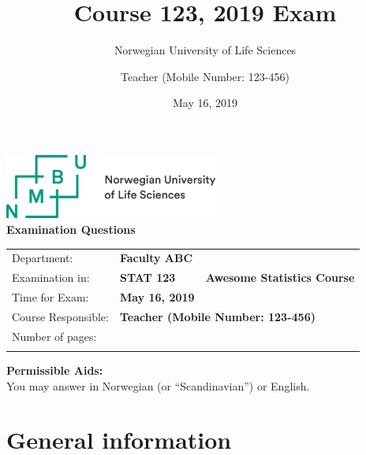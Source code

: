 \documentclass[
11pt,%
a4paper,%
]%
{article}%
\title{Course 123, 2019 Exam}
\subtitle{Norwegian University of Life Sciences}
\author{Teacher (Mobile Number: 123-456)}
\date{May 16, 2019}
\begin{document}
{\centering\includegraphics[width=7cm]{Logo.png}\\\vspace{24pt}}
\doublespacing
\textbf{\Huge Examination Questions}
\vspace{10pt}\\
\begin{tabularx}{\textwidth}{llX}
\toprule
Department: & 
  \multicolumn{2}{l}{\textbf{Faculty ABC}} \\
\cmidrule(r){2-3}
Examination in: & 
  \textbf{STAT 123}& 
  \textbf{Awesome Statistics Course}\\
\cmidrule(r){2-3}
Time for Exam: & 
  \textbf{May 16, 2019} & 
  \\
\cmidrule(r){2-3}
Course Responsible: & \multicolumn{2}{l}{\textbf{Teacher (Mobile Number: 123-456)}} \\
\cmidrule(r){2-3}
Number of pages: & \multicolumn{2}{l}{\textbf{\pageref{LastPage}}} \\
& \multicolumn{2}{l}{} \\
\bottomrule
\end{tabularx}
\vspace{10pt}
\newline
\textbf{\large Permissible Aids:}\\

You may answer in Norwegian (or ``Scandinavian'') or English.







\hypertarget{general-information}{%
\section{General information}\label{general-information}}
\end{document}
